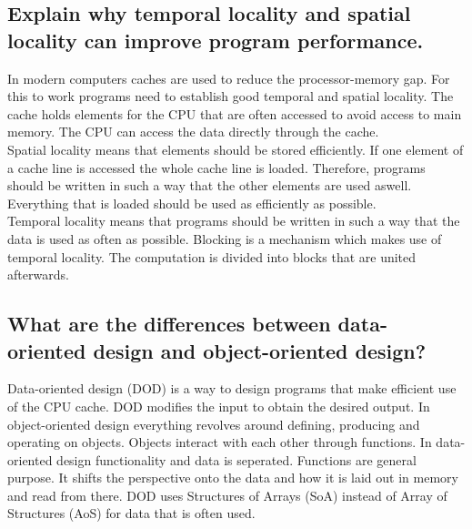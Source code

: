 \documentclass[runningheads]{llncs}
\begin{document}




\subsection{Explain why temporal locality and spatial locality can improve program performance.}
In modern computers caches are used to reduce the processor-memory gap.
For this to work programs need to establish good temporal and spatial locality.
The cache holds elements for the CPU that are often accessed to avoid access to main memory.
The CPU can access the data directly through the cache.
\\
Spatial locality means that elements should be stored efficiently. 
If one element of a cache line is accessed the whole cache line is loaded.
Therefore, programs should be written in such a way that the other elements are used aswell.
Everything that is loaded should be used as efficiently as possible.
\\
Temporal locality means that programs should be written in such a way that the data is used as often as possible.
Blocking is a mechanism which makes use of temporal locality. 
The computation is divided into blocks that are united afterwards.

\subsection{What are the differences between data-oriented design and object-oriented design?}
Data-oriented design (DOD) is a way to design programs that make efficient use of the CPU cache. 
DOD modifies the input to obtain the desired output.
In object-oriented design everything revolves around defining, producing and operating on objects.
Objects interact with each other through functions.
In data-oriented design functionality and data is seperated. Functions are general purpose.
It shifts the perspective onto the data and how it is laid out in memory and read from there.
DOD uses Structures of Arrays (SoA) instead of Array of Structures (AoS) for data that is often used.
\end{document}
